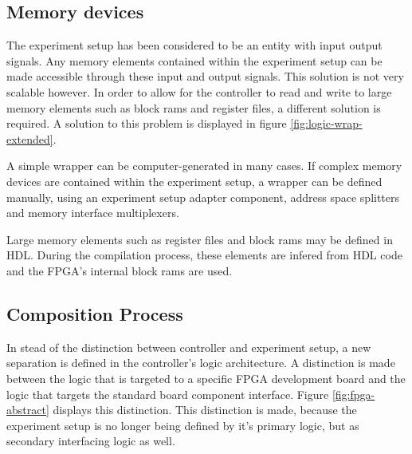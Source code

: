 \documentclass[openright]{template/uva-bachelor-thesis}
\begin{document}
\subsection{Memory devices}

The experiment setup has been considered to be an entity with input output signals. Any memory elements contained within the experiment setup can be made accessible through these input and output signals. This solution is not very scalable however. In order to allow for the controller to read and write to large memory elements such as block rams and register files, a different solution is required. A solution to this problem is displayed in figure \ref{fig:logic-wrap-extended}. 

A simple wrapper can be computer-generated in many cases. If complex memory devices are contained within the experiment setup, a wrapper can be defined manually, using an experiment setup adapter component, address space splitters and memory interface multiplexers. 

Large memory elements such as register files and block rams may be defined in HDL. During the compilation process, these elements are infered from HDL code and the FPGA's internal block rams are used. 



\subsection{Composition Process}
In stead of the distinction between controller and experiment setup, a new separation is defined in the controller's logic architecture. A distinction is made between the logic that is targeted to a specific FPGA development board and the logic that targets the standard board component interface. Figure \ref{fig:fpga-abstract} displays this distinction. This distinction is made, because the experiment setup is no longer being defined by it's primary logic, but as secondary interfacing logic as well. 
\end{document}
